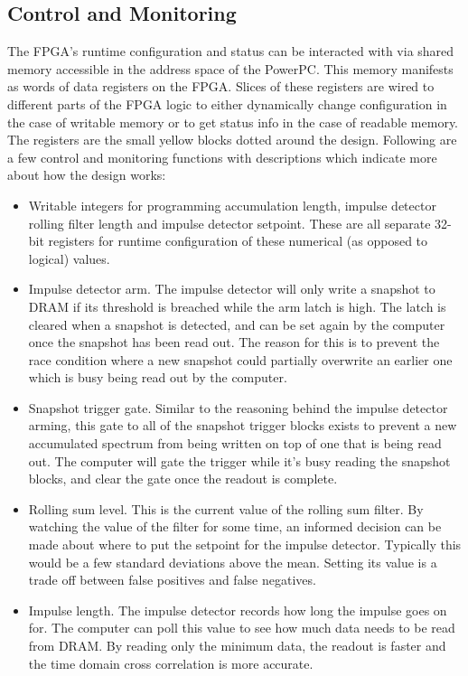 \subsection{Control and Monitoring}
The FPGA's runtime configuration and status can be interacted with via shared memory accessible in the address space of the PowerPC. This memory manifests as words of data registers on the FPGA. Slices of these registers are wired to different parts of the FPGA logic to either dynamically change configuration in the case of writable memory or to get status info in the case of readable memory. The registers are the small yellow blocks dotted around the design. Following are a few control and monitoring functions with descriptions which indicate more about how the design works:
\begin{itemize}
  \item Writable integers for programming accumulation length, impulse detector rolling filter length and impulse detector setpoint. These are all separate 32-bit registers for runtime configuration of these numerical (as opposed to logical) values.
  \item Impulse detector arm. The impulse detector will only write a snapshot to DRAM if its threshold is breached while the arm latch is high. The latch is cleared when a snapshot is detected, and can be set again by the computer once the snapshot has been read out. The reason for this is to prevent the race condition where a new snapshot could partially overwrite an earlier one which is busy being read out by the computer.
  \item Snapshot trigger gate. Similar to the reasoning behind the impulse detector arming, this gate to all of the snapshot trigger blocks exists to prevent a new accumulated spectrum from being written on top of one that is being read out. The computer will gate the trigger while it's busy reading the snapshot blocks, and clear the gate once the readout is complete.
  \item Rolling sum level. This is the current value of the rolling sum filter. By watching the value of the filter for some time, an informed decision can be made about where to put the setpoint for the impulse detector. Typically this would be a few standard deviations above the mean. Setting its value is a trade off between false positives and false negatives.
  \item Impulse length. The impulse detector records how long the impulse goes on for. The computer can poll this value to see how much data needs to be read from DRAM. By reading only the minimum data, the readout is faster and the time domain cross correlation is more accurate.

\end{itemize}
